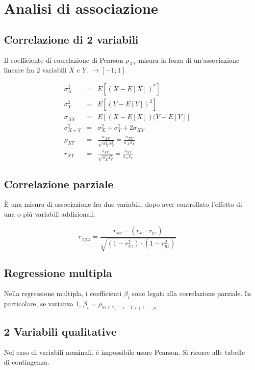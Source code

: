 \documentclass[11pt,onecolumn,a4paper,oneside]{book}
\begin{document}
\chapter{Analisi di associazione}

	\section{Correlazione di 2 variabili}

Il coefficiente di correlazione di Pearson $\rho_{XY}$ misura la forza di un'associazione lineare fra 2 variabili $X$ e $Y$.
$\rightarrow [-1;1]$

\begin{eqnarray}
 \sigma^2_X & = & E\left[(X-E\left[X\right])^2\right]\\
 \sigma^2_Y & = & E\left[(Y-E\left[Y\right])^2\right]\\
 \sigma_{XY} & = & E\left[(X-E\left[X\right])(Y-E\left[Y\right]\right]\\
 \sigma^2_{X+Y} & = & \sigma^2_X + \sigma^2_Y + 2 \sigma_{XY}\\
 \rho_{XY} & = & \frac{\sigma_{XY}}{\sqrt{\sigma^2_X \sigma^2_Y}} = \frac{\sigma_{XY}}{\sigma_X \sigma_Y}\\
r_{XY} & = & \frac{s_{XY}}{\sqrt{s^2_X s^2_Y}} = \frac{s_{XY}}{s_X s_Y}
\end{eqnarray}

\section{Correlazione parziale}
È una misura di associazione fra due variabili, dopo aver controllato l'effetto di una o più variabili addizionali.

$$
r_{xy.z} = \frac{r_{xy}- \left(r_{xz} \cdot r_{yz} \right)}{\sqrt{ \left(1-r^2_{xz} \right) \cdot \left(1-r^2_{yz} \right) }} $$

\section{Regressione multipla}

Nella regressione multipla, i coefficienti $\beta_i$ sono legati alla correlazione parziale.
In particolare, se varianza 1, $\beta_i = \rho_{Yi.1,2,\dots ,i-1,i+1, \dots, p}$


\section{2 Variabili qualitative}
Nel caso di variabili nominali, è impossibile usare Pearson. Si ricorre alle tabelle di contingenza.
\end{document}
